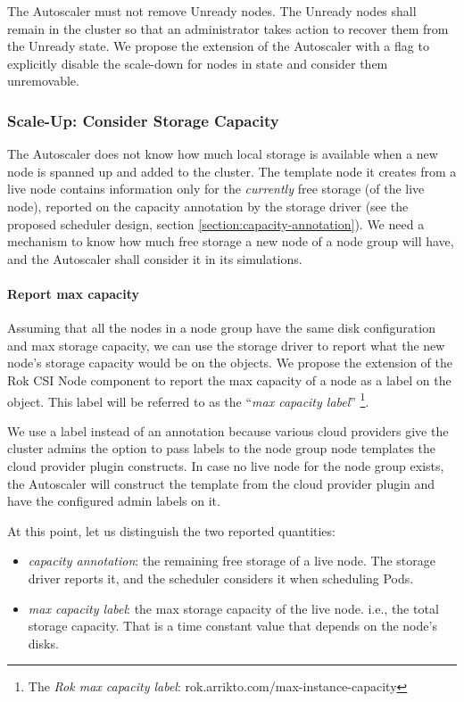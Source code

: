 The Autoscaler must not remove Unready nodes. The Unready nodes shall remain in
the cluster so that an administrator takes action to recover them from the
Unready state. We propose the extension of the Autoscaler with a flag to
explicitly disable the scale-down for nodes in  state and consider
them unremovable.

\subsubsection{Scale-Up: Consider Storage Capacity}
The Autoscaler does not know how much local storage is available when a new node
is spanned up and added to the cluster. The template node it creates from a live
node contains information only for the \textit{currently} free storage (of the
live node), reported on the capacity annotation by the storage driver (see the
proposed scheduler design, section \ref{section:capacity-annotation}). We need a
mechanism to know how much free storage a new node of a node group will have,
and the Autoscaler shall consider it in its simulations.

\paragraph*{Report max capacity}
Assuming that all the nodes in a node group have the same disk configuration and
max storage capacity, we can use the storage driver to report what the new
node's storage capacity would be on the  objects. We propose the
extension of the Rok CSI Node component to report the max capacity of a node as
a label on the  object. This label will be referred to as the
``\textit{max capacity label}'' \footnote{The \textit{Rok max capacity label}:
      rok.arrikto.com/max-instance-capacity}.

We use a label instead of an annotation because various cloud providers give the
cluster admins the option to pass labels to the node group node templates the
cloud provider plugin constructs. In case no live node for the node group
exists, the Autoscaler will construct the template from the cloud provider
plugin and have the configured admin labels on it.

At this point, let us distinguish the two reported quantities:
\begin{itemize}
      \tightlist
      \item \textit{capacity annotation}: the remaining free storage of a live
            node. The storage driver reports it, and the scheduler considers it
            when scheduling Pods.
      \item \textit{max capacity label}: the max storage capacity of the live
            node. i.e., the total storage capacity. That is a time constant
            value that depends on the node's disks.
\end{itemize}

